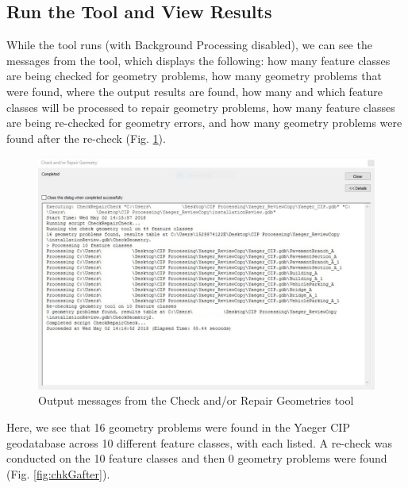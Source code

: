 \documentclass[openany]{book}
\theoremstyle{definition}
\theoremstyle{definition}
\theoremstyle{definition}
\theoremstyle{remark}
\begin{document}
\subsection{Run the Tool and View
Results}\label{run-the-tool-and-view-results-5}

While the tool runs (with Background Processing disabled), we can see
the messages from the tool, which displays the following: how many
feature classes are being checked for geometry problems, how many
geometry problems that were found, where the output results are found,
how many and which feature classes will be processed to repair geometry
problems, how many feature classes are being re-checked for geometry
errors, and how many geometry problems were found after the re-check
(Fig. \ref{fig:chkGmessages}).

\begin{figure}[H]

{\centering \includegraphics{figures/chkG-messages} 

}

\caption{Output messages from the Check and/or Repair Geometries tool}\label{fig:chkGmessages}
\end{figure}

Here, we see that 16 geometry problems were found in the Yaeger CIP
geodatabase across 10 different feature classes, with each listed. A
re-check was conducted on the 10 feature classes and then 0 geometry
problems were found (Fig. \ref{fig:chkGafter}).
\end{document}
